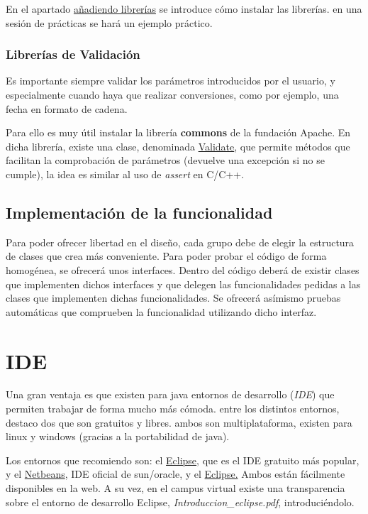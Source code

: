 \documentclass[11pt]{article}
\begin{document}
En el apartado \hyperref[sec-5]{añadiendo librerías} se introduce cómo instalar las librerías. en una sesión de prácticas se
hará un ejemplo práctico. 
\subsubsection{Librerías de Validación}
\label{sec-2-2-3}




Es importante siempre validar los parámetros introducidos por el usuario, y especialmente cuando haya
que realizar conversiones, como por ejemplo, una fecha en formato de cadena.


Para ello es muy útil instalar la librería \textbf{commons} de la fundación Apache. En dicha librería, existe una clase, 
denominada \href{http://commons.apache.org/lang/api-2.5/org/apache/commons/lang/Validate.html}{Validate}, que permite métodos que facilitan la comprobación de parámetros
(devuelve una excepción si no se cumple), la idea es similar al uso de \emph{assert} en C/C++.
\subsection{Implementación de la funcionalidad}
\label{sec-2-3}




Para poder ofrecer libertad en el diseño, cada grupo debe de elegir la estructura de clases que crea más conveniente.
Para poder probar el código de forma homogénea, se ofrecerá unos interfaces. Dentro del código deberá de existir
clases que implementen dichos interfaces y que delegen las funcionalidades pedidas a las clases que implementen
dichas funcionalidades. Se ofrecerá asímismo
pruebas automáticas que comprueben la funcionalidad utilizando dicho interfaz.
\section{IDE}
\label{sec-3}
\label{ide}




Una gran ventaja es que existen para java entornos de desarrollo (\emph{IDE}) que permiten trabajar de forma
mucho más cómoda. entre los distintos entornos, destaco dos que son gratuitos y libres. ambos son
multiplataforma, existen para linux y windows (gracias a la portabilidad de java). 


Los entornos que recomiendo son: el \href{http://eclipse.org/}{Eclipse}, que es el IDE gratuito más popular, y el 
\href{http://netbeans.org/}{Netbeans}, IDE oficial de sun/oracle, y el \href{http://eclipse.org/}{Eclipse.} Ambos están fácilmente
disponibles en la web. A su vez, en el campus virtual existe una transparencia sobre el entorno de desarrollo
Eclipse, \emph{Introduccion\_{}eclipse.pdf}, introduciéndolo. 
\end{document}

